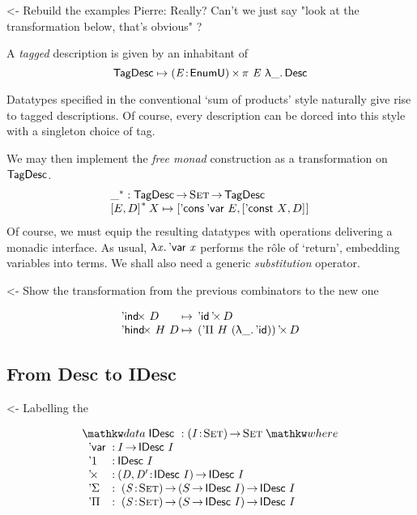 \documentclass[preprint, authoryear, onecolumn]{sigplanconf}
\newenvironment{structure}{\footnotesize\verbatim}{\endverbatim}
\begin{document}
\begin{structure}
<- Rebuild the examples
Pierre: Really? Can't we just say "look at the transformation below, that's obvious" ?
\end{structure}

A \emph{tagged} description is given by an inhabitant of
\[
 \F{TagDesc} \mapsto \SIGMA{\V{E}}{\EnumU}\spi{\V{E}}{\LAM{\_}\Desc}
\]


\newcommand{\FM}[1]{{#1}^{\F{\(\ast\)}}}
Datatypes specified in the conventional `sum of products' style naturally give rise to tagged descriptions. Of course, every description can be dorced into this style with a singleton choice of tag.

We may then implement the \emph{free monad} construction as a
transformation on \(\F{TagDesc}\).
\[\stk{
\FM{\_} : \F{TagDesc} \To \Set \To \F{TagDesc} \\
\FM{\pair{E}{D}{}}\:X \mapsto
\pair{\ListCons{\:\DVar{}}{E}}{\pair{\DConst{X}}{D}{}}{}
}\]
Of course, we must equip the resulting datatypes with operations delivering a monadic interface. As usual, \(\LAM{\x}\DVar{\x}\) performs the r\^ole of `return', embedding variables into terms. We shall also need a generic \emph{substitution} operator.

\begin{structure}
<- Show the transformation from the previous combinators to the new one
\end{structure}

\[\begin{array}{l@{\:\mapsto\:\:}l}
\DIndx{D}         & \DProd{\DId}{D}                      \\
\DHindx{H}{D}     & \DProd{(\DPi{H}{(\LAM{\_} \DId)})}{D}
\end{array}
\]


\subsection{From Desc to IDesc}

\begin{structure}
<- Labelling the \DId
\end{structure}

\[
\stk{
\data \IDesc{} : \PI{\V{I}}{\Set}{\Set} \where \\
\;\;\begin{array}{@{}l@{\::\:}l@{\quad}l}
    \DVar           & I \To \IDesc{I}                                   \\
    \DUnit          & \IDesc{I}                                         \\
    \DProd{}{}      & \PI{\V{D}, \V{D'}}{\IDesc{I}} \IDesc{I}           \\
    \DSigma         & \PI{\V{S}}{\Set} \PIS{S \To \IDesc{I}} \IDesc{I}  \\
    \DPi            & \PI{\V{S}}{\Set} \PIS{S \To \IDesc{I}} \IDesc{I} 
\end{array}
}
\]
\end{document}
